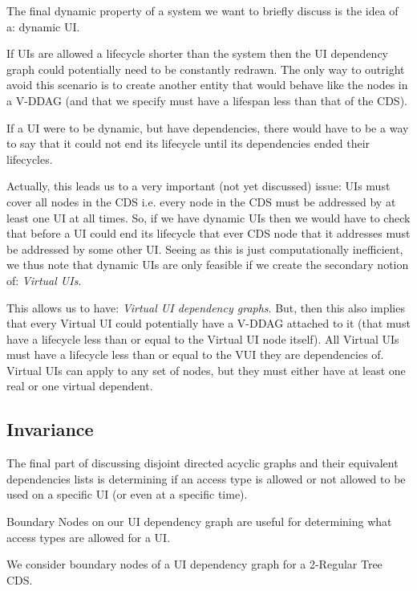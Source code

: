 The final dynamic property of a system we want to briefly discuss is the idea of a: dynamic UI.

If UIs are allowed a  lifecycle shorter than the system then the UI dependency graph could potentially need to be constantly redrawn. The only way to outright avoid this scenario is to create another entity that would behave like the nodes in a V-DDAG (and that we specify must have a lifespan less than that of the CDS).

If a UI were to be dynamic, but have dependencies, there would have to be a way to say that it could not end its lifecycle until its dependencies ended their lifecycles.

Actually, this leads us to a very important (not yet discussed) issue: UIs must cover all nodes in the CDS i.e. every node in the CDS must be addressed by at least one UI at all times. So, if we have dynamic UIs then we would have to check that before a UI could end its lifecycle that ever CDS node that it addresses must be addressed by some other UI. Seeing as this is just computationally inefficient, we thus note that dynamic UIs are only feasible if we create the secondary notion of: \textit{Virtual UIs}.

This allows us to have: \textit{Virtual UI dependency graphs}. But, then this also implies that every Virtual UI could potentially have a V-DDAG attached to it (that must have a lifecycle less than or equal to the Virtual UI node itself). All Virtual UIs  must have a lifecycle less than or equal to the VUI they are dependencies of. Virtual UIs can apply to any set of nodes, but they must either have at least one real or one virtual dependent.

\subsection{Invariance}

The final part of discussing disjoint directed acyclic graphs and their equivalent dependencies lists is determining if an access type is allowed or not allowed to be used on a specific UI (or even at a specific time).

Boundary Nodes on our UI dependency graph are useful for determining what access types are allowed for a UI.

\begin{con-def}[Boundaries]
	\label{boundaries}
\end{con-def}

\begin{con-ex} 
	\label{2-regular-tree}
	We consider boundary nodes of a UI dependency graph for a 2-Regular Tree CDS.
\end{con-ex}

